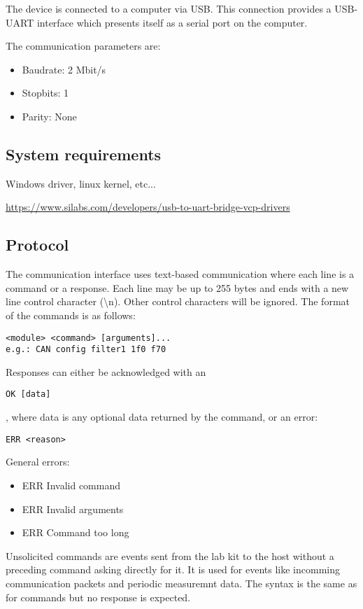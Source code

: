 \documentclass{article}[a4paper]
\begin{document}
The device is connected to a computer via USB. This connection provides a
USB-UART interface which presents itself as a serial port on the computer.

The communication parameters are:
\begin{itemize}
\item Baudrate: 2 Mbit/s
\item Stopbits: 1
\item Parity: None
\end{itemize}

\subsection{System requirements}

Windows driver, linux kernel, etc...

\url{https://www.silabs.com/developers/usb-to-uart-bridge-vcp-drivers}

\subsection{Protocol}

The communication interface uses text-based communication where each line is a
command or a response. Each line may be up to 255 bytes and ends with a new
line control character
(\textbackslash n). Other control characters will be ignored. The format of
the commands is as follows:
\begin{verbatim}
<module> <command> [arguments]...
e.g.: CAN config filter1 1f0 f70
\end{verbatim}

Responses can either be acknowledged with an
\begin{verbatim}
OK [data]
\end{verbatim}
, where data is any optional data returned by the command, or an error:
\begin{verbatim}
ERR <reason>
\end{verbatim}

General errors:
\begin{itemize}
\item ERR Invalid command
\item ERR Invalid arguments
\item ERR Command too long
\end{itemize}

Unsolicited commands are events sent from the lab kit to the host without a
preceding command asking directly for it. It is used for events like incomming
communication packets and periodic measuremnt data. The syntax is the same as
for commands but no response is expected.
\end{document}
